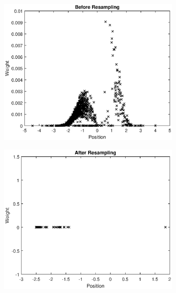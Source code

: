\documentclass{article}
\begin{document}
\begin{figure}
\centering
\begin{subfigure}{.6\textwidth}
    \centering
    \includegraphics[scale=0.6]{before_sampling_1.eps}
\end{subfigure}%
\begin{subfigure}{.6\textwidth}
    \centering
    \includegraphics[scale=0.6]{after_sampling_1.eps}
\end{subfigure}
\begin{subfigure}{.6\textwidth}
    \centering

\end{subfigure}
\end{figure}
\end{document}
